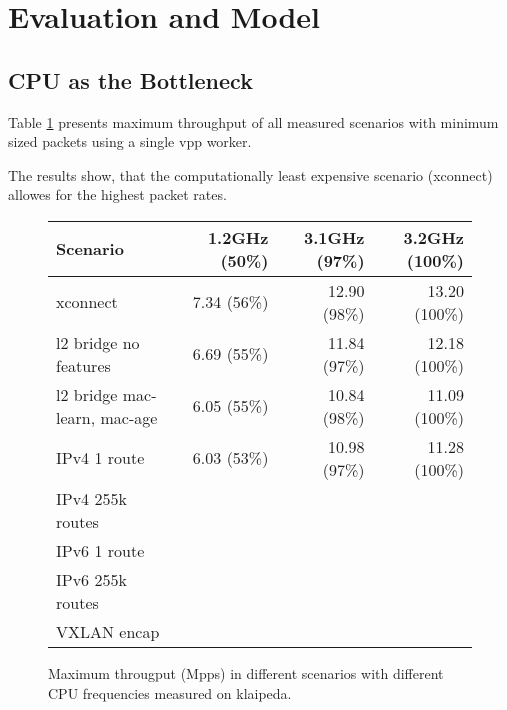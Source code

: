 \section{Evaluation and Model}







\subsection{CPU as the Bottleneck}
\label{sec:cpubottleneck}

Table \ref{table:bottleneck} presents maximum throughput of all
measured scenarios with minimum sized packets using a single \Ac{vpp}
worker. 

The results show, that the computationally least expensive scenario (xconnect) allowes for the highest packet rates. 

\begin{figure}[!ht]
	\vspace{5ex}
	\begin{tabular}[]{ l r r r }
		Scenario & 1.2GHz (50\%) & 3.1GHz (97\%)  & 3.2GHz (100\%) \\ 
		\midrule
		xconnect & 7.34 (56\%) & 12.90 (98\%) & 13.20 (100\%) \\ %
		l2 bridge no features & 6.69 (55\%) & 11.84 (97\%) & 12.18 (100\%) \\ %
		l2 bridge mac-learn, mac-age & 6.05 (55\%) & 10.84 (98\%) & 11.09 (100\%) \\ %
		IPv4 1 route & 6.03 (53\%) & 10.98 (97\%) & 11.28 (100\%) \\ %
		IPv4 255k routes & \\
		IPv6 1 route & \\
		IPv6 255k routes & \\
		VXLAN encap & \\
		\midrule
	\end{tabular}
	\caption{Maximum througput (Mpps) in different scenarios with different CPU frequencies measured on klaipeda. }
	\label{table:bottleneck}
\end{figure}


